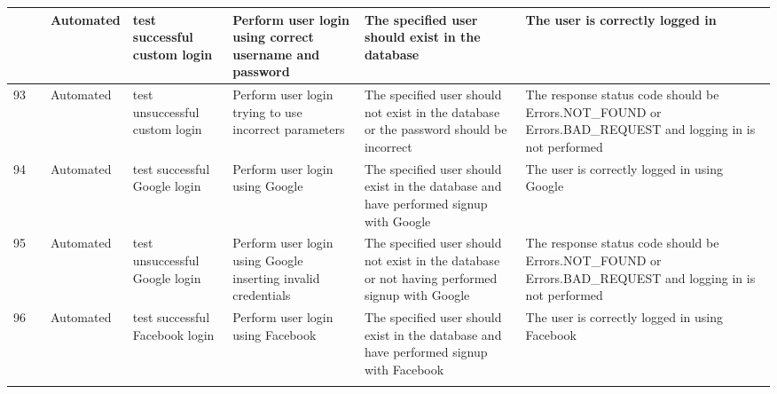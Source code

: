 \documentclass{article}
\begin{document}
{\begin{tabular}{|
      >{\columncolor[HTML]{FFFFFF}}l |
      >{\columncolor[HTML]{FFFFFF}}c |
      >{\columncolor[HTML]{FFFFFF}}l |l|l|l|l|}
    {\color[HTML]{11734B} 92} & \cellcolor[HTML]{FFFFFF}                                       & {\color[HTML]{11734B} Automated} & test successful custom login        & Perform user login using correct username and password                              & The specified user should exist in the database                                                       & The user is correctly logged in                                                                                       \\ \cline{1-1} \cline{3-7}
    {\color[HTML]{11734B} 93} & \cellcolor[HTML]{FFFFFF}                                       & {\color[HTML]{11734B} Automated} & test unsuccessful custom login      & Perform user login trying to use incorrect parameters                               & The specified user should not exist in the database or the password should be incorrect               & The response status code should be Errors.NOT\_FOUND or Errors.BAD\_REQUEST and logging in is not performed           \\ \cline{1-1} \cline{3-7}
    {\color[HTML]{11734B} 94} & \cellcolor[HTML]{FFFFFF}                                       & {\color[HTML]{11734B} Automated} & test successful Google login        & Perform user login using Google                                                     & The specified user should exist in the database and have performed signup with Google                 & The user is correctly logged in using Google                                                                          \\ \cline{1-1} \cline{3-7}
    95                        & \cellcolor[HTML]{FFFFFF}                                       & {\color[HTML]{11734B} Automated} & test unsuccessful Google login      & Perform user login using Google inserting invalid credentials                       & The specified user should not exist in the database or not having performed signup with Google        & The response status code should be Errors.NOT\_FOUND or Errors.BAD\_REQUEST and logging in is not performed           \\ \cline{1-1} \cline{3-7}
    96                        & \cellcolor[HTML]{FFFFFF}                                       & {\color[HTML]{11734B} Automated} & test successful Facebook login      & Perform user login using Facebook                                                   & The specified user should exist in the database and have performed signup with Facebook               & The user is correctly logged in using Facebook                                                                        \\ \cline{1-1} \cline{3-7}

\end{tabular}}
\end{document}
